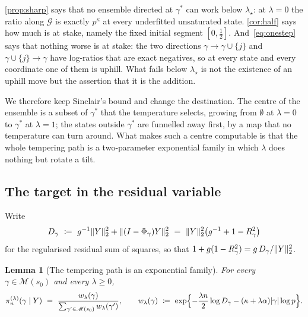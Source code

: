 \documentclass[aos]{imsart}
\DeclarePairedDelimiter{\norm}{\lVert}{\rVert}
\DeclarePairedDelimiter{\abs}{\lvert}{\rvert}
\theoremstyle{plain}
\newtheorem{lemma}{Lemma}[section]
\theoremstyle{definition}
\begin{document}
    \cref{prop:sharp} says that no ensemble directed at $\gamma^{\ast}$ can
    work below $\lambda_\star$: at $\lambda=0$ the ratio along $\mathcal{G}$
    is exactly $p^{\kappa}$ at every underfitted unsaturated state.
    \cref{cor:half} says how much is at stake, namely the fixed initial
    segment $[0,\tfrac12]$. And~\eqref{eq:onestep} says that nothing worse is
    at stake: the two directions $\gamma\to\gamma\cup\{j\}$ and
    $\gamma\cup\{j\}\to\gamma$ have log-ratios that are exact negatives, so at
    every state and every coordinate one of them is uphill. What fails below
    $\lambda_\star$ is not the existence of an uphill move but the assertion
    that it is the addition.

    We therefore keep Sinclair's bound and change the destination. The centre
    of the ensemble is a subset of $\gamma^{\ast}$ that the temperature
    selects, growing from $\emptyset$ at $\lambda=0$ to $\gamma^{\ast}$ at
    $\lambda=1$; the states outside $\gamma^{\ast}$ are funnelled away first,
    by a map that no temperature can turn around. What makes such a centre
    computable is that the whole tempering path is a two-parameter
    exponential family in which $\lambda$ does nothing but rotate a tilt.

    \subsection{The target in the residual variable}
    \label{sub:resid}

    Write
    \begin{equation}
        \label{eq:Ddef}
        D_\gamma\ \coloneq\ g^{-1}\norm Y_2^{2}
        +\norm{(I-\Phi_\gamma)Y}_2^{2}
        \ =\ \norm Y_2^{2}\bigl(g^{-1}+1-R^{2}_\gamma\bigr)
    \end{equation}
    for the regularised residual sum of squares, so that
    $1+g(1-R^{2}_\gamma)=g\,D_\gamma/\norm Y_2^{2}$.

    \begin{lemma}[The tempering path is an exponential family]
        \label{lemma:expfam}
        For every $\gamma\in\mathscr{M}(s_0)$ and every $\lambda\geq0$,
        \begin{equation}
            \label{eq:wlam}
            \pi_n^{(\lambda)}(\gamma\mid Y)
            \ =\ \frac{w_\lambda(\gamma)}
            {\sum_{\gamma'\in\mathscr{M}(s_0)}w_\lambda(\gamma')},
            \qquad
            w_\lambda(\gamma)\ \coloneq\
            \exp\Bigl\{-\frac{\lambda n}{2}\log D_\gamma
            -(\kappa+\lambda\alpha)\abs\gamma\log p\Bigr\} .
        \end{equation}
    \end{lemma}
\end{document}
